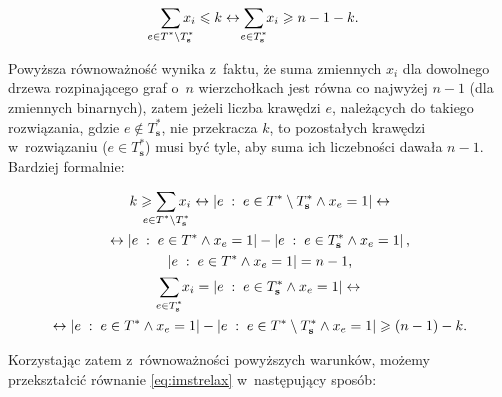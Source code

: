 \begin{gather}
	\sum_{\mathclap{e \in T^{\ast} \setminus T^{\ast}_{\textbf{s}}}} x_{i} \leqslant k \leftrightarrow \sum_{\mathclap{e \in T^{\ast}_{\textbf{s}}}} x_{i} \geqslant n - 1 - k\text{.}
\end{gather}


Powyższa równoważność wynika z~faktu, że suma zmiennych $x_{i}$ dla dowolnego drzewa rozpinającego graf o~$n$ wierzchołkach jest równa co najwyżej $n - 1$ (dla zmiennych binarnych), zatem jeżeli liczba krawędzi $e$, należących do takiego rozwiązania, gdzie $e \notin T^{\ast}_{\textbf{s}}$, nie przekracza $k$, to pozostałych krawędzi w~rozwiązaniu ($e \in T^{\ast}_{\textbf{s}}$) musi być tyle, aby suma ich liczebności dawała $n - 1$.
Bardziej formalnie:

\begin{gather}
	k \geqslant \sum_{\mathclap{e \in T^{\ast} \setminus T^{\ast}_{\textbf{s}}}} x_{i} \leftrightarrow \left| e \; : \; e \in T^{\ast} \setminus T^{\ast}_{\textbf{s}} \wedge x_{e} = 1 \right| \leftrightarrow\\
	\leftrightarrow \left| e \; : \; e \in T^{\ast} \wedge x_{e} = 1 \right| - \left| e \; : \; e \in T^{\ast}_{\textbf{s}} \wedge x_{e} = 1 \right|\text{,}\\
	\left| e \; : \; e \in T^{\ast} \wedge x_{e} = 1 \right| = n - 1\text{,}\\
	\sum_{\mathclap{e \in T^{\ast}_{\textbf{s}}}} x_{i} = \left| e \; : \; e \in T^{\ast}_{\textbf{s}} \wedge x_{e} = 1 \right| \leftrightarrow\\
	\leftrightarrow \left| e \; : \; e \in T^{\ast} \wedge x_{e} = 1 \right| - \left| e \; : \; e \in T^{\ast} \setminus T^{\ast}_{\textbf{s}} \wedge x_{e} = 1 \right| \geqslant \left( n - 1 \right) - k\text{.}
\end{gather}

Korzystając zatem z~równoważności powyższych warunków, możemy przekształcić równanie \ref{eq:imstrelax} w~następujący sposób:

